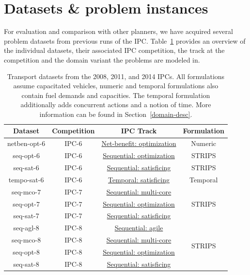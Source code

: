 \section{Datasets \& problem instances}\label{datasets}

For evaluation and comparison with other planners, we have acquired several problem datasets from previous runs of the IPC.
Table~\ref{tab:ipc-datasets} provides an overview of the individual datasets, their associated IPC competition, the track at the competition and the domain variant the problems are modeled in.

\begin{table}[tb]
\centering
\begin{tabular}{c||ccc}
\textbf{Dataset} & \textbf{Competition} & \textbf{IPC Track} & \textbf{Formulation} \\ 
\midrule
\midrule
netben-opt-6 & IPC-6 & \href{http://icaps-conference.org/ipc2008/deterministic/NetBenefitOptimization.html}{Net-benefit: optimization} & Numeric \\ 
seq-opt-6 & IPC-6 & \href{http://icaps-conference.org/ipc2008/deterministic/SequentialOptimization.html}{Sequential: optimization} & STRIPS \\ 
seq-sat-6 & IPC-6 & \href{http://icaps-conference.org/ipc2008/deterministic/SequentialSatisficing.html}{Sequential: satisficing} & STRIPS \\ 
tempo-sat-6 & IPC-6 & \href{http://icaps-conference.org/ipc2008/deterministic/TemporalSatisficing.html}{Temporal: satisficing} & Temporal \\ 
\midrule
seq-mco-7 & IPC-7 & \href{http://www.plg.inf.uc3m.es/ipc2011-deterministic/SequentialMulticore.html}{Sequential: multi-core} & \multirow{3}{*}{STRIPS} \\ 
seq-opt-7 & IPC-7 & \href{http://www.plg.inf.uc3m.es/ipc2011-deterministic/SequentialOptimization.html}{Sequential: optimization} &  \\ 
seq-sat-7 & IPC-7 & \href{http://www.plg.inf.uc3m.es/ipc2011-deterministic/SequentialSatisficing.html}{Sequential: satisficing} &  \\ 
\midrule
seq-agl-8 & IPC-8 & \href{https://helios.hud.ac.uk/scommv/IPC-14/seqagi.html}{Sequential: agile} & \multirow{4}{*}{STRIPS} \\ 
seq-mco-8 & IPC-8 & \href{https://helios.hud.ac.uk/scommv/IPC-14/seqmulti.html}{Sequential: multi-core} &  \\ 
seq-opt-8 & IPC-8 & \href{https://helios.hud.ac.uk/scommv/IPC-14/seqopt.html}{Sequential: optimization} &  \\ 
seq-sat-8 & IPC-8 & \href{https://helios.hud.ac.uk/scommv/IPC-14/seqsat.html}{Sequential: satisficing} &  \\ 
\end{tabular}
\caption[Transport datasets from the 2008, 2011, and 2014 IPCs.]{Transport datasets from the 2008, 2011, and 2014 IPCs. All formulations assume capacitated vehicles, numeric and temporal formulations also contain fuel demands and capacities. The temporal formulation additionally adds concurrent actions and a notion of time. More information can be found in Section~\ref{domain-desc}.}
\label{tab:ipc-datasets}
\end{table}

